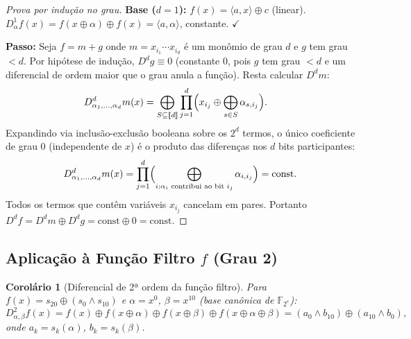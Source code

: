 \documentclass[12pt,a4paper]{article}
\newtheorem{corollary}[theorem]{Corolário}
\theoremstyle{definition}
\theoremstyle{remark}
\newcommand{\GF}[1]{\mathbb{F}_{2^{#1}}}
\newcommand{\xor}{\oplus}
\newcommand{\AND}{\wedge}
\newcommand{\filter}{f}
\begin{document}
\begin{proof}[Prova por indução no grau]
  \textbf{Base ($d=1$):} $f(x) = \langle a, x \rangle \xor c$ (linear).
  $D^1_\alpha f(x) = f(x\xor\alpha) \xor f(x) = \langle a,\alpha\rangle$,
  constante. $\checkmark$

  \textbf{Passo:} Seja $f = m + g$ onde $m = x_{i_1}\cdots x_{i_d}$ é um
  monômio de grau $d$ e $g$ tem grau $< d$. Por hipótese de indução,
  $D^d g \equiv 0$ (constante 0, pois $g$ tem grau $< d$ e um diferencial
  de ordem maior que o grau anula a função). Resta calcular $D^d m$:
  \begin{align*}
    D^d_{\alpha_1,\ldots,\alpha_d} m(x)
    &= \bigoplus_{S \subseteq [\![d]\!]} \prod_{j=1}^d
       \Bigl(x_{i_j} \xor \bigoplus_{s \in S} \alpha_{s,i_j}\Bigr).
  \end{align*}
  Expandindo via inclusão-exclusão booleana sobre os $2^d$ termos,
  o único coeficiente de grau 0 (independente de $x$) é o produto
  das diferenças nos $d$ bits participantes:
  \[
    D^d_{\alpha_1,\ldots,\alpha_d} m(x)
    = \prod_{j=1}^d \Bigl(\bigoplus_{i: \alpha_i \text{ contribui ao bit } i_j}
      \alpha_{i,i_j}\Bigr) = \text{const}.
  \]
  Todos os termos que contêm variáveis $x_{i_j}$ cancelam em pares.
  Portanto $D^d f = D^d m \xor D^d g = \text{const} \xor 0 = \text{const}$.
\end{proof}

\subsection{Aplicação à Função Filtro $\filter$ (Grau 2)}

\begin{corollary}[Diferencial de 2ª ordem da função filtro]
  \label{cor:d2-filter}
  Para $\filter(x) = s_{20} \xor (s_0 \AND s_{10})$ e
  $\alpha = x^0$, $\beta = x^{10}$ (base canônica de $\GF{e}$):
  \[
    D^2_{\alpha,\beta} \filter(x) = \filter(x) \xor \filter(x\xor\alpha)
                       \xor \filter(x\xor\beta) \xor \filter(x\xor\alpha\xor\beta)
    = (a_0 \AND b_{10}) \xor (a_{10} \AND b_0),
  \]
  onde $a_k = s_k(\alpha)$, $b_k = s_k(\beta)$.
\end{corollary}
\end{document}
